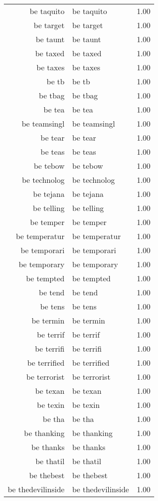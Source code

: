 \begin{table}[ht]
\begin{tabular}{rlr}
  be taquito & be taquito & 1.00 \\ 
  be target & be target & 1.00 \\ 
  be taunt & be taunt & 1.00 \\ 
  be taxed & be taxed & 1.00 \\ 
  be taxes & be taxes & 1.00 \\ 
  be tb & be tb & 1.00 \\ 
  be tbag & be tbag & 1.00 \\ 
  be tea & be tea & 1.00 \\ 
  be teamsingl & be teamsingl & 1.00 \\ 
  be tear & be tear & 1.00 \\ 
  be teas & be teas & 1.00 \\ 
  be tebow & be tebow & 1.00 \\ 
  be technolog & be technolog & 1.00 \\ 
  be tejana & be tejana & 1.00 \\ 
  be telling & be telling & 1.00 \\ 
  be temper & be temper & 1.00 \\ 
  be temperatur & be temperatur & 1.00 \\ 
  be temporari & be temporari & 1.00 \\ 
  be temporary & be temporary & 1.00 \\ 
  be tempted & be tempted & 1.00 \\ 
  be tend & be tend & 1.00 \\ 
  be tens & be tens & 1.00 \\ 
  be termin & be termin & 1.00 \\ 
  be terrif & be terrif & 1.00 \\ 
  be terrifi & be terrifi & 1.00 \\ 
  be terrified & be terrified & 1.00 \\ 
  be terrorist & be terrorist & 1.00 \\ 
  be texan & be texan & 1.00 \\ 
  be texin & be texin & 1.00 \\ 
  be tha & be tha & 1.00 \\ 
  be thanking & be thanking & 1.00 \\ 
  be thanks & be thanks & 1.00 \\ 
  be thatil & be thatil & 1.00 \\ 
  be thebest & be thebest & 1.00 \\ 
  be thedevilinside & be thedevilinside & 1.00 \\ 

\end{tabular}
\end{table}
